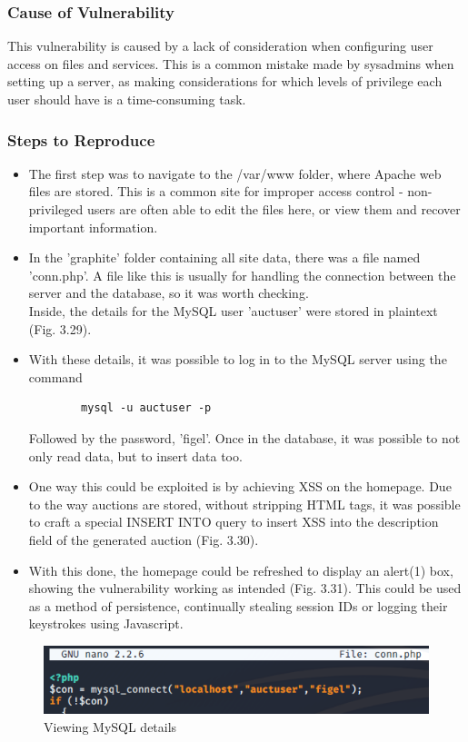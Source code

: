 \documentclass{report}
\begin{document}
\subsubsection{Cause of Vulnerability}
This vulnerability is caused by a lack of consideration when configuring user access on files and services. This is a common mistake made by sysadmins when setting up a server, as making considerations for which levels of privilege each user should have is a time-consuming task.
\subsubsection{Steps to Reproduce}
\begin{itemize}
	\item The first step was to navigate to the /var/www folder, where Apache web files are stored. This is a common site for improper access control - non-privileged users are often able to edit the files here, or view them and recover important information.
	\item In the 'graphite' folder containing all site data, there was a file named 'conn.php'. A file like this is usually for handling the connection between the server and the database, so it was worth checking.\\
	Inside, the details for the MySQL user 'auctuser' were stored in plaintext (Fig. 3.29).
	\item With these details, it was possible to log in to the MySQL server using the command
	\begin{verbatim}
		mysql -u auctuser -p
	\end{verbatim}
	Followed by the password, 'figel'. Once in the database, it was possible to not only read data, but to insert data too.
	\item One way this could be exploited is by achieving XSS on the homepage. Due to the way auctions are stored, without stripping HTML tags, it was possible to craft a special INSERT INTO query to insert XSS into the description field of the generated auction (Fig. 3.30).
	\item With this done, the homepage could be refreshed to display an alert(1) box, showing the vulnerability working as intended (Fig. 3.31). This could be used as a method of persistence, continually stealing session IDs or logging their keystrokes using Javascript.
\end{itemize}
\begin{figure}[!htb]
	\centering
	\includegraphics[scale=0.6]{img/xss1.png}
	\caption{Viewing MySQL details}
\end{figure}
\end{document}
